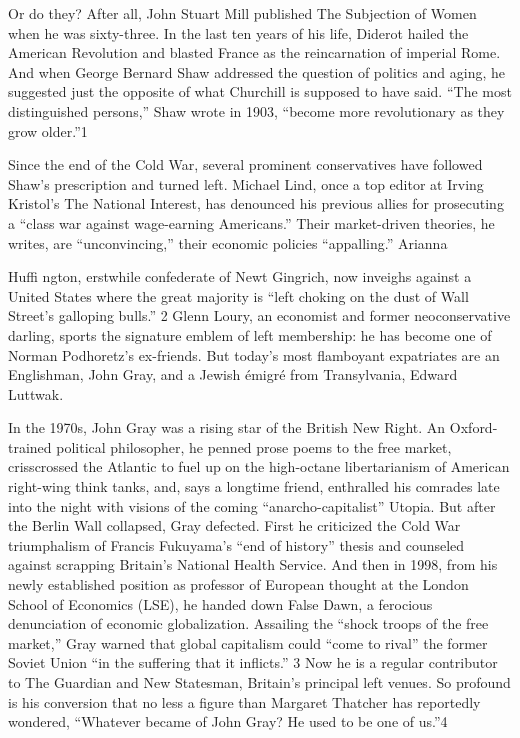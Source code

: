  \par 
Or do they? After all, John Stuart Mill published The Subjection of Women when he was sixty-three. In the last ten years of his life, Diderot hailed the American Revolution and blasted France as the reincarnation of imperial Rome. And when George Bernard Shaw addressed the question of politics and aging, he suggested just the opposite of what Churchill is supposed to have said. “The most distinguished persons,” Shaw wrote in 1903, “become more revolutionary as they grow older.”{\color{blue}1}
 \par 
Since the end of the Cold War, several prominent conservatives have followed Shaw’s prescription and turned left. Michael Lind, once a top editor at Irving Kristol’s The National Interest, has denounced his previous allies for prosecuting a “class war against wage-earning Americans.” Their market-driven theories, he writes, are “unconvincing,” their economic policies “appalling.” Arianna
 \par 
Huffi ngton, erstwhile confederate of Newt Gingrich, now inveighs against a United States where the great majority is “left choking on the dust of Wall Street’s galloping bulls.” {\color{blue}2} Glenn Loury, an economist and former neoconservative darling, sports the signature emblem of left membership: he has become one of Norman Podhoretz’s ex-friends. But today’s most flamboyant expatriates are an Englishman, John Gray, and a Jewish émigré from Transylvania, Edward Luttwak.
 \par 
In the 1970s, John Gray was a rising star of the British New Right. An Oxford-trained political philosopher, he penned prose poems to the free market, crisscrossed the Atlantic to fuel up on the high-octane libertarianism of American right-wing think tanks, and, says a longtime friend, enthralled his comrades late into the night with visions of the coming “anarcho-capitalist” Utopia. But after the Berlin Wall collapsed, Gray defected. First he criticized the Cold War triumphalism of Francis Fukuyama’s “end of history” thesis and counseled against scrapping Britain’s National Health Service. And then in 1998, from his newly established position as professor of European thought at the London School of Economics (LSE), he handed down False Dawn, a ferocious denunciation of economic globalization. Assailing the “shock troops of the free market,” Gray warned that global capitalism could “come to rival” the former Soviet Union “in the suffering that it inflicts.” {\color{blue}3} Now he is a regular contributor to The Guardian and New Statesman, Britain’s principal left venues. So profound is his conversion that no less a figure than Margaret Thatcher has reportedly wondered, “Whatever became of John Gray? He used to be one of us.”{\color{blue}4}
